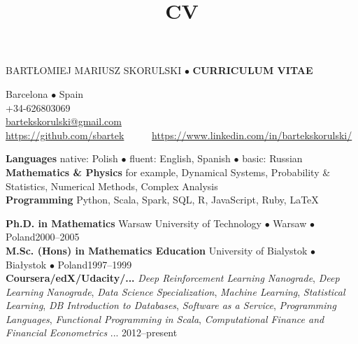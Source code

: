 \documentclass[a4paper, twoside]{scrreprt}
\title{CV}
\author{}
\date{}
\begin{document}
\noindent BARTŁOMIEJ MARIUSZ SKORULSKI $\bullet$ \textbf{CURRICULUM VITAE}
\vspace{-0.3cm}

\noindent\makebox[\linewidth]{\rule{\textwidth}{0.4pt}}

{\small
\noindent\llap{\FA \faHome\ \ } Barcelona $\bullet$ Spain\\
\noindent\llap{\FA \faMobilePhone\ \ \ }+34-626803069\\
\noindent\llap{\FA \faEnvelope\ \ }\href{mailto:bartekskorulski@gmail.com}{bartekskorulski@gmail.com}\\
\noindent\llap{\FA \faGithub\ \ }
\href{https://github.com/sbartek}{https://github.com/sbartek}\ \ \ 
{\FA \faLinkedin\ \ }
\href{https://www.linkedin.com/in/bartekskorulski}{https://www.linkedin.com/in/bartekskorulski/}
}

\noindent\makebox[\linewidth]{\rule{\textwidth}{0.4pt}}

\vspace{0.1cm}


\noindent\llap{\FA \faComments\ \ }\textbf{Languages} native: Polish $\bullet$ fluent: English, Spanish $\bullet$ basic: Russian \\
\noindent\llap{\FA \faSuperscript\ \ }\textbf{Mathematics \& Physics} for example, Dynamical Systems, Probability \& Statistics, Numerical Methods, 
Complex Analysis\\
\noindent\llap{\FA \faSave\ \ }\textbf{Programming} Python, Scala, Spark, SQL, R, JavaScript, Ruby,
\LaTeX \\
\noindent\makebox[\linewidth]{\rule{\textwidth}{0.4pt}}

\vspace{0.1cm}
\noindent\textbf{Ph.D. in Mathematics} Warsaw University of Technology $\bullet$ Warsaw $\bullet$ Poland\hfill 2000--2005\\
\noindent\textbf{M.Sc. (Hons) in Mathematics Education} University of Bialystok $\bullet$ Białystok $\bullet$ Poland\hfill 1997--1999\\
\noindent\textbf{Coursera/edX/Udacity/...} \emph{Deep Reinforcement Learning Nanograde},
\emph{Deep Learning Nanograde}, \emph{Data Science Specialization}, \emph{Machine Learning}, 
\emph{Statistical Learning}, \emph{DB Introduction to Databases}, \emph{Software as a Service}, 
\emph{Programming Languages}, \emph{Functional Programming in Scala}, 
\emph{Computational Finance and Financial Econometrics} ... \hfill 2012--present\\
\noindent\makebox[\linewidth]{\rule{\textwidth}{0.4pt}}
\end{document}
